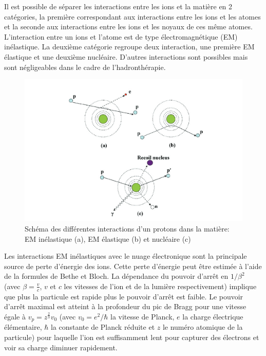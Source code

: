 \documentclass[11pt,a4paper,oldfontcommands]{memoir}
\begin{document}
Il est possible de séparer les interactions entre les ions et la matière en 2 catégories, la première correspondant aux interactions entre les ions et les atomes et la seconde aux interactions entre les ions et les noyaux de ces même atomes. L'interaction entre un ions et l'atome est de type électromagnétique (EM) inélastique. La deuxième catégorie regroupe deux interaction, une première EM élastique et une deuxième nucléaire. D'autres interactions sont possibles mais sont négligeables dans le cadre de l'hadronthérapie.\\
\begin{figure}[h!]
    \centering
    \includegraphics{intro/Newhauser2015.PNG}
    \caption{Schéma des différentes interactions d'un protons dans la matière: EM inélastique (a), EM élastique (b) et nucléaire (c) \cite{Newhauser_2015}}
    \label{fig:my_label}
\end{figure}

Les interactions EM inélastiques avec le nuage électronique sont la principale source de perte d'énergie des ions.  Cette perte d'énergie peut être estimée à l'aide de la formules de Bethe et Bloch. La dépendance du pouvoir d'arrêt en $1/\beta^2$ (avec $\beta = \frac{v}{c}$, $v$ et $c$ les vitesses de l'ion et de la lumière respectivement) implique que plus la particule est rapide plus le pouvoir d'arrêt est faible. Le pouvoir d'arrêt maximal est atteint à la profondeur du pic de Bragg pour une vitesse égale à $v_p = z^{\frac{2}{3}}v_0$ (avec $v_0 = e^2/\hbar$ la vitesse de Planck, $e$ la charge électrique élémentaire, $\hbar$ la constante de Planck réduite et $z$ le numéro atomique de la particule) pour laquelle l'ion est suffisamment lent pour capturer des électrons et voir sa charge diminuer rapidement. 
\end{document}
